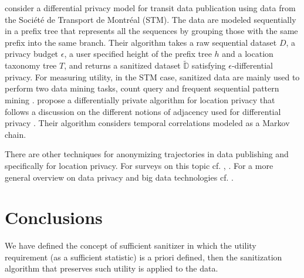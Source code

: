 \documentclass[times,twocolumn,final,authoryear]{elsarticle}
\begin{document}
\cite{Chen:2012} consider a differential privacy model for transit data publication using data from the Soci\'{e}t\'{e} de Transport de Montr\'{e}al (STM). 
The data are modeled sequentially in a prefix tree that represents all the sequences by grouping those with the same prefix into the same branch.
Their algorithm takes a raw sequential dataset $D$, a privacy budget $\epsilon$, a user specified height of the prefix tree $h$ and a location taxonomy tree $T$, and returns a sanitized dataset $\widetilde{\mathbb{D}}$ satisfying $\epsilon$-differential privacy.
For measuring utility, in the STM case, sanitized data are mainly used to perform two
data mining tasks, count query and frequent sequential pattern mining \citep{Agrawal:1995}.
\cite{Xiao:2015} propose a differentially private algorithm for location privacy that follows a discussion on the different notions of adjacency used for  differential privacy \cite{Chatzik:2013,Kifer:2011}.
Their algorithm considers temporal correlations modeled as a Markov chain.

{\color{blue}
There are other techniques for anonymizing trajectories in data publishing and specifically for
location privacy. For surveys on this topic cf. \cite{Fiore:2019}, \cite{Primault:2019}.
For a more general overview on data privacy and big data technologies cf. \cite{Torra:book}}.  
\section{Conclusions}\label{Sec:conclusions}
We have defined the concept of sufficient sanitizer in which the utility requirement (as a sufficient statistic) is a priori defined, then the sanitization algorithm that preserves such utility is applied to the data.
\end{document}
